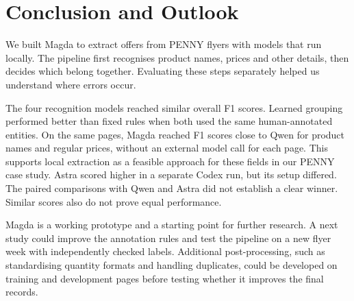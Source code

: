 \section{Conclusion and Outlook}\label{sec:conclusion}
We built Magda to extract offers from PENNY flyers with models that run locally. The pipeline first recognises product names, prices and other details, then decides which belong together. Evaluating these steps separately helped us understand where errors occur.

The four recognition models reached similar overall F1 scores. Learned grouping performed better than fixed rules when both used the same human-annotated entities. On the same pages, Magda reached F1 scores close to Qwen for product names and regular prices, without an external model call for each page. This supports local extraction as a feasible approach for these fields in our PENNY case study. Astra scored higher in a separate Codex run, but its setup differed. The paired comparisons with Qwen and Astra did not establish a clear winner. Similar scores also do not prove equal performance.

Magda is a working prototype and a starting point for further research. A next study could improve the annotation rules and test the pipeline on a new flyer week with independently checked labels. Additional post-processing, such as standardising quantity formats and handling duplicates, could be developed on training and development pages before testing whether it improves the final records.
